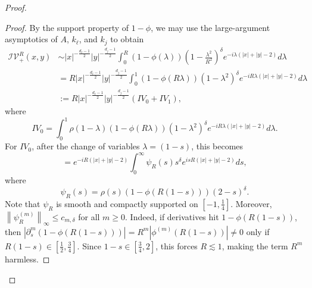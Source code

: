 \documentclass[12pt]{amsart}
\begin{document}
\begin{proof}
\begin{proof}
By the support property of $1-\phi$, we may use the large-argument asymptotics of $A$, $k_\ell$, and $k_j$ to obtain
\begin{align*}\nonumber
\mathcal{IV}_{+}^R(x,y)
&\sim
|x|^{-\frac{d_\ell-1}{2}}|y|^{-\frac{d_j-1}{2}}
\int_0^R
(1-\phi(\lambda))
\left(1-\frac{\lambda^2}{R^2}\right)^\delta
e^{-i\lambda(|x|+|y|-2)} d\lambda\\ 
&= R |x|^{-\frac{d_\ell-1}{2}}|y|^{-\frac{d_j-1}{2}}
\int_0^1
(1-\phi(R\lambda))
(1-\lambda^2)^\delta
e^{-iR\lambda(|x|+|y|-2)} d\lambda\\ \nonumber
&:= R |x|^{-\frac{d_\ell-1}{2}}|y|^{-\frac{d_j-1}{2}} \left(IV_0+IV_1\right),
\end{align*}
where
\begin{equation*}
    IV_0 = \int_0^1 \rho(1-\lambda)
(1-\phi(R\lambda))
(1-\lambda^2)^\delta
e^{-iR\lambda(|x|+|y|-2)} d\lambda.
\end{equation*}
For $IV_0$, after the change of variables $\lambda=(1-s)$, this becomes
\begin{equation*}
=e^{-iR(|x|+|y|-2)}
\int_0^\infty
\psi_R(s)s^\delta e^{isR(|x|+|y|-2)} ds,
\end{equation*}
where
\begin{equation*}
    \psi_R(s)=\rho(s)(1-\phi(R(1-s)))(2-s)^\delta.
\end{equation*}
Note that $\psi_R$ is smooth and compactly supported on $[-1,\frac{1}{4}]$. Moreover, $\left\|  \psi_R^{(m)}  \right\|_\infty \le c_{m,\delta}$ for all $m\ge 0$. Indeed, if derivatives hit $1-\phi(R(1-s))$, then $|\partial_s^m(1-\phi(R(1-s)))| = R^m |\phi^{(m)}(R(1-s))| \ne 0$ only if $R(1-s)\in [\frac{1}{2},\frac{3}{4}]$. Since $1-s\in [\frac{3}{4},2]$, this forces $R \lesssim 1$, making the term $R^m$ harmless.


\end{proof}
\end{proof}
\end{document}
